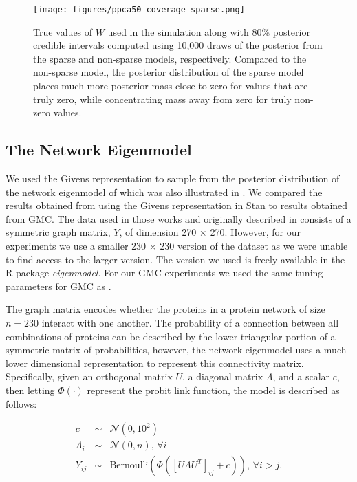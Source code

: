 \documentclass[ba]{imsart}
\numberwithin{equation}{section}
\theoremstyle{plain}
\begin{document}
\begin{figure}[h]
\centering
\vspace{.1in}
\texttt{[image: figures/ppca50\_coverage\_sparse.png]}
\vspace{.05in}
\caption{True values of $W$ used in the simulation along with 80\% posterior credible intervals computed using 10,000 draws of the posterior from the sparse and non-sparse models, respectively. Compared to the non-sparse model, the posterior distribution of the sparse model places much more posterior mass close to zero for values that are truly zero, while concentrating mass away from zero for truly non-zero values.}
\label{fig:ppca50_coverage_sparse}
\end{figure}

\subsection{The Network Eigenmodel}
We used the Givens representation to sample from the posterior distribution of the network eigenmodel of \cite{hoff2009simulation} which was also illustrated in \cite{byrne2013geodesic}. We compared the results obtained from using the Givens representation in Stan to results obtained from GMC. The data used in those works and originally described in \cite{butland2005interaction} consists of a symmetric graph matrix, $Y$, of dimension 270 $\times$ 270. However, for our experiments we use a smaller 230 $\times$ 230 version of the dataset as we were unable to find access to the larger version. The version we used is freely available in the R package \textit{eigenmodel}. For our GMC experiments we used the same tuning parameters for GMC as \cite{byrne2013geodesic}.

\noindent The graph matrix encodes whether the proteins in a protein network of size $n=230$ interact with one another. The probability of a connection between all combinations of proteins can be described by the lower-triangular portion of a symmetric matrix of probabilities, however, the network eigenmodel uses a much lower dimensional representation to represent this connectivity matrix. Specifically, given an orthogonal matrix $U$, a diagonal matrix $\Lambda$, and a scalar $c$, then letting $\Phi(\cdot)$ represent the probit link function, the model is described as follows:

\begin{eqnarray}
c &\sim& \mathcal{N}(0, 10^2)\\
\Lambda_i &\sim& \mathcal{N}(0, n),\, \forall i\\
Y_{ij} &\sim& \mathrm{Bernoulli} \left(\Phi ([U \Lambda U^T]_{ij} + c) \right),\, \forall i > j.
\end{eqnarray}
\end{document}
